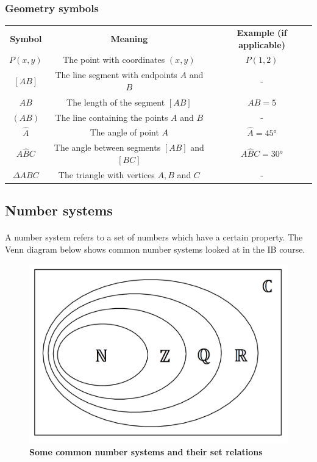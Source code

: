 \documentclass[12pt, a4paper, titlepage, twoside]{article}
\begin{document}
	{\centering \subsubsection*{Geometry symbols}}
	
	{\centering
		\begin{longtable}{|c|c|c|} 
 			\hline
			\textbf{Symbol} & \textbf{Meaning} & \textbf{Example (if applicable)}\\
			\hhline{|=|=|=|}
			$P(x,y)$ & The point with coordinates $(x,y)$ & $P(1,2)$\\
			\hline
			$[AB]$ & The line segment with endpoints $A$ and $B$ & -\\
			\hline
			$AB$ & The length of the segment $[AB]$ & $AB = 5$\\
			\hline
			$(AB)$ & The line containing the points $A$ and $B$ & -\\
			\hline
			$\hat{A}$ & The angle of point $A$ & $\hat{A} = \ang{45}$\\
			\hline
			$A\hat{B}C$ & The angle between segments $[AB]$ and $[BC]$ & $A\hat{B}C = \ang{30}$\\
			\hline
			$\Delta ABC$ & The triangle with vertices $A,B$ and $C$ & -\\
			\hline
		\end{longtable}}
	
	\hfill
	
	\subsection{Number systems}
	
	\paragraph{}
	A number system refers to a set of numbers which have a certain property. The Venn diagram below shows common number systems 
	looked at in the IB course.
	
	\begin{figure}[H]
		\centering
		\includegraphics[width=12cm]{algebra-venn.png}
		\caption*{\textbf{Some common number systems and their set relations}}
	\end{figure}
	
\end{document}
